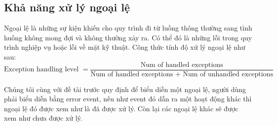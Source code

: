 \subsection{Khả năng xử lý ngoại lệ}
Ngoại lệ là những sự kiện khiến cho quy trình đi từ luồng thông thường sang tình huống không mong đợi và không thường xảy ra. Có thể đó là những lỗi trong quy trình nghiệp vụ hoặc lỗi về mặt kỹ thuật. Công thức tính độ xử lý ngoại lệ như sau:
\[ \text{Exception handling level } = \frac{\text{Num of handled exceptions}}{\text{Num of handled exceptions + Num of unhandled exceptions}}\]
\par
Chúng tôi cùng với đề tài trước quy định để biểu
diễn một ngoại lệ, người dùng phải biểu diễn bằng error event, nếu như event đó dẫn ra một hoạt động khác thì ngoại lệ đó được xem như là đã được xử lý. Còn lại các ngoại lệ khác sẽ được xem như chưa được xử lý.
